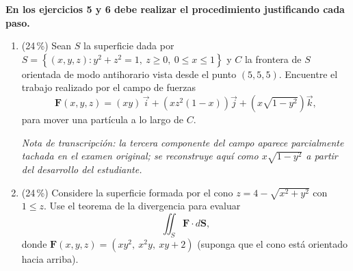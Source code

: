 \documentclass[11pt]{article}
\begin{document}
\vspace{4pt}
\noindent\textbf{En los ejercicios 5 y 6 debe realizar el procedimiento justificando cada paso.}

\begin{enumerate}[start=5]
\item{} (24\,\%) Sean $S$ la superficie dada por $S = \left\{(x,y,z) : y^2 + z^2 = 1,\ z \geq 0,\ 0 \leq x \leq 1\right\}$ y $C$ la frontera de $S$ orientada de modo antihorario vista desde el punto $(5,5,5)$. Encuentre el trabajo realizado por el campo de fuerzas
\[
\mathbf F(x,y,z) = (xy)\,\vec i + \left(xz^2(1-x)\right)\vec j + \left(x\sqrt{1-y^2}\right)\vec k,
\]
para mover una partícula a lo largo de $C$.

\vspace{2pt}
\noindent\footnotesize\textit{Nota de transcripción: la tercera componente del campo aparece parcialmente tachada en el examen original; se reconstruye aquí como $x\sqrt{1-y^2}$ a partir del desarrollo del estudiante.}\normalsize

\item{} (24\,\%) Considere la superficie formada por el cono $z = 4 - \sqrt{x^2+y^2}$ con $1 \leq z$. Use el teorema de la divergencia para evaluar
\[
\iint_S \mathbf F \cdot d\mathbf S,
\]
donde $\mathbf F(x,y,z) = (xy^2,\ x^2y,\ xy + 2)$ (suponga que el cono está orientado hacia arriba).
\end{enumerate}

\examfooter
\end{document}
